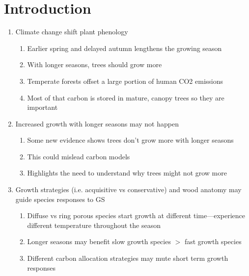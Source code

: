 \section*{Introduction}
\begin{enumerate}
\item Climate change shift plant phenology
  \begin{enumerate}
  
  \item Earlier spring and delayed autumn lengthens the growing season
  
  \item With longer seasons, trees should grow more
  
  \item Temperate forests offset a large portion of human CO2 emissions
  
  \item Most of that carbon is stored in mature, canopy trees so they are important
  \end{enumerate}

\item Increased growth with longer seasons may not happen
  \begin{enumerate}
  \item Some new evidence shows trees don't grow more with longer seasons
  
  \item This could mislead carbon models
  
  \item Highlights the need to understand why trees might not grow more
  
  \end{enumerate}
  
\item Growth strategies (i.e. acquisitive vs conservative) and wood anatomy may guide species responses to GS
  \begin{enumerate}
  
  \item Diffuse vs ring porous species start growth at different time---experience different temperature throughout the season
  
  \item Longer seasons may benefit slow growth species $>$ fast growth species %
  
  \item Different carbon allocation strategies may mute short term growth responses %
  

\end{enumerate}
\end{enumerate}
